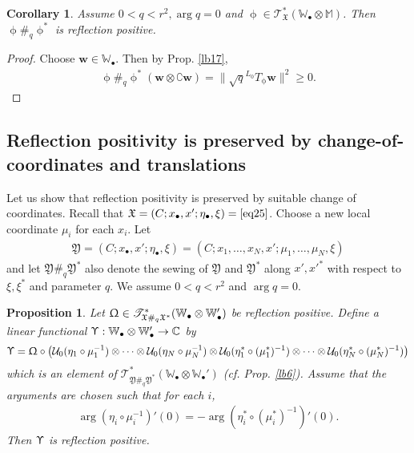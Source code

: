 \documentclass[11pt,b5paper,notitlepage]{article}
\theoremstyle{definition}
\theoremstyle{plain}
\newtheorem{pp}[df]{Proposition}
\newtheorem{co}[df]{Corollary}
\newcommand{\fk}{\mathfrak}
\newcommand{\mc}{\mathcal}
\newcommand{\scr}{\mathscr}
\newcommand{\Co}{\complement}
\newcommand{\blt}{\bullet}
\newcommand{\Wbb}{\mathbb W}
\newcommand{\Mbb}{\mathbb M}
\newcommand{\Cbb}{\mathbb C}
\newcommand{\wbf}{\mathbf w}
\numberwithin{equation}{section}
\begin{document}
\begin{co}
Assume $0<q<r^2,\arg q=0$ and $\upphi\in\scr T_{\fk X}^*(\Wbb_\blt\otimes\Mbb)$. Then $\upphi\#_q\upphi^*$ is reflection positive.
\end{co}

\begin{proof}
Choose $\wbf\in\Wbb_\blt$. Then by Prop. \ref{lb17},
\begin{align*}
\upphi\#_q\upphi^*(\wbf\otimes\Co\wbf)=\big\lVert \sqrt q^{L_0}T_\upphi \wbf   \big\lVert ^2\geq 0.
\end{align*}
\end{proof}



\subsection{Reflection positivity is preserved by change-of-coordinates and translations}


Let us show that reflection positivity is preserved by suitable change of coordinates. Recall that $\fk X=(C;x_\blt,x';\eta_\blt,\xi)=\eqref{eq25}$. Choose a new local coordinate $\mu_i$ for each $x_i$. Let
\begin{align*}
\fk Y=(C;x_\blt,x';\eta_\blt,\xi)=(C;x_1,\dots,x_N,x';\mu_1,\dots,\mu_N,\xi)
\end{align*}
and let $\fk Y\#_q\fk Y^*$ also denote the sewing of $\fk Y$ and $\fk Y^*$ along $x',x'^*$ with respect to $\xi,\xi^*$ and parameter $q$. We assume $0<q<r^2$ and $\arg q=0$.

\begin{pp}\label{lb42}
Let $\Upomega\in\scr T_{\fk X\#_q\fk X^*}^*(\Wbb_\blt\otimes\Wbb_\blt')$ be reflection positive. Define a linear functional $\Upupsilon:\Wbb_\blt\otimes\Wbb_\blt'\rightarrow\Cbb$ by
\begin{align*}
\Upupsilon=\Upomega\circ\big(\mc U_0(\eta_1\circ\mu_1^{-1})\otimes\cdots\otimes\mc U_0(\eta_N\circ\mu_N^{-1})\otimes\mc U_0(\eta_1^*\circ(\mu_1^*)^{-1})\otimes\cdots\otimes\mc U_0(\eta_N^*\circ(\mu_N^*)^{-1}) \big)
\end{align*}
which is an element of $\scr T_{\fk Y\#_q\fk Y^*}^*(\Wbb_\blt\otimes\Wbb_\blt')$ (cf. Prop. \ref{lb6}). Assume that the arguments are chosen such that for each $i$,
\begin{align}
\arg (\eta_i\circ\mu_i^{-1})'(0)=-\arg(\eta_i^*\circ(\mu_i^*)^{-1})'(0).  \label{eq26}
\end{align}
Then $\Upupsilon$ is reflection positive.
\end{pp}
\end{document}
